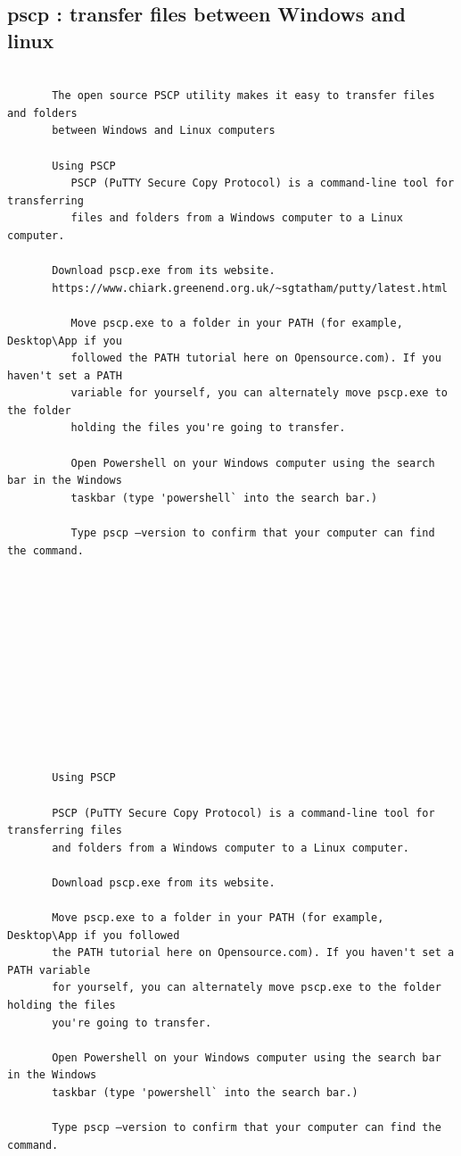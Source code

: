 \documentclass[a4paper,12pt]{article}
\begin{document}
\subsection{pscp : transfer files between Windows and linux}
\begin{verbatim}

       The open source PSCP utility makes it easy to transfer files and folders 
       between Windows and Linux computers

       Using PSCP
          PSCP (PuTTY Secure Copy Protocol) is a command-line tool for transferring     
          files and folders from a Windows computer to a Linux computer.

       Download pscp.exe from its website.
       https://www.chiark.greenend.org.uk/~sgtatham/putty/latest.html

          Move pscp.exe to a folder in your PATH (for example, Desktop\App if you 
          followed the PATH tutorial here on Opensource.com). If you haven't set a PATH 
          variable for yourself, you can alternately move pscp.exe to the folder 
          holding the files you're going to transfer.

          Open Powershell on your Windows computer using the search bar in the Windows 
          taskbar (type 'powershell` into the search bar.)

          Type pscp –version to confirm that your computer can find the command.












       Using PSCP

       PSCP (PuTTY Secure Copy Protocol) is a command-line tool for transferring files  
       and folders from a Windows computer to a Linux computer.

       Download pscp.exe from its website.

       Move pscp.exe to a folder in your PATH (for example, Desktop\App if you followed   
       the PATH tutorial here on Opensource.com). If you haven't set a PATH variable 
       for yourself, you can alternately move pscp.exe to the folder holding the files 
       you're going to transfer.

       Open Powershell on your Windows computer using the search bar in the Windows 
       taskbar (type 'powershell` into the search bar.)

       Type pscp –version to confirm that your computer can find the command.
       

\end{verbatim}
\end{document}
